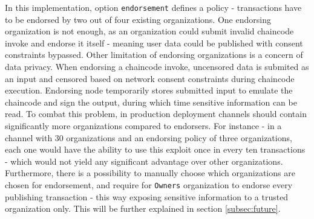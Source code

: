 \documentclass[12pt]{article}
\begin{document}
    In this implementation, option \lstinline{endorsement} defines a policy - transactions have to be endorsed by two out of four existing organizations. One endorsing organization is not enough, as an organization could submit invalid chaincode invoke and endorse it itself - meaning user data could be published with consent constraints bypassed. Other limitation of endorsing organizations is a concern of data privacy. When endorsing a chaincode invoke, uncensored data is submited as an input and censored based on network consent constraints during chaincode execution. Endorsing node temporarily stores submitted input to emulate the chaincode and sign the output, during which time sensitive information can be read. To combat this problem, in production deployment channels should contain significantly more organizations compared to endorsers. For instance - in a channel with 30 organizations and an endorsing policy of three organizations, each one would have the ability to use this exploit once in every ten transactions - which would not yield any significant advantage over other organizations. Furthermore, there is a possibility to manually choose which organizations are chosen for endorsement, and require for \lstinline{Owners} organization to endorse every publishing transaction - this way exposing sensitive information to a trusted organization only. This will be further explained in section \ref{subsec:future}.
\end{document}
